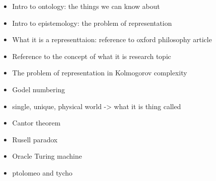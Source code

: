 \begin{itemize}
\item Intro to ontology: the things we can know about
\item Intro to epistemology: the problem of representation
\item What it is a representtaion: reference to oxford philosophy article
\item Reference to the concept of what it is research topic
\item The problem of representation in Kolmogorov complexity
\item Godel numbering
\item single, unique, physical world -> what it is thing called
\item Cantor theorem
\item Rusell paradox
\item Oracle Turing machine
\item ptolomeo and tycho
\end{itemize}


